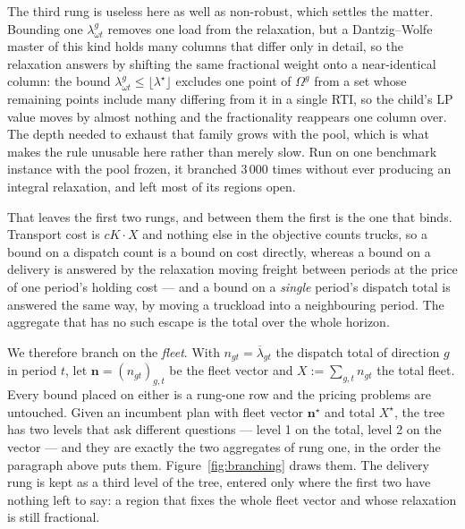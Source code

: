 The third rung is useless here as well as non-robust, which settles the
matter. Bounding
one $\lambda^{g}_{\omega t}$ removes one load from the relaxation, but a
Dantzig--Wolfe master of this kind holds many columns that differ only
in detail, so the relaxation answers by shifting the same fractional
weight onto a near-identical column: the bound
$\lambda^{g}_{\omega t}\le\lfloor\lambda^{\star}\rfloor$ excludes one
point of $\Omega^{g}$ from a set whose remaining points include many
differing from it in a single RTI, so the child's LP value moves by
almost nothing and the fractionality reappears one column over. The
depth needed to exhaust that family grows with the pool, which is what
makes the rule unusable here rather than merely slow. Run on one
benchmark instance with the pool frozen, it branched $3\,000$ times
without ever producing an integral relaxation, and left most of its
regions open.

That leaves the first two rungs, and between them the first is the one
that binds. Transport cost is $cK\cdot X$ and nothing else in the
objective counts trucks, so a bound on a dispatch count is a bound on
cost directly, whereas a bound on a delivery is answered by the
relaxation moving freight between periods at the price of one period's
holding cost --- and a bound on a \emph{single} period's dispatch total
is answered the same way, by moving a truckload into a neighbouring
period. The aggregate that has no such escape is the total over the
whole horizon.

We therefore branch on the \emph{fleet}. With $n_{gt}=\overline{\lambda}_{gt}$
the dispatch total of direction $g$ in period $t$, let
$\mathbf{n}=(n_{gt})_{g,t}$ be the fleet vector and
$X:=\sum_{g,t}n_{gt}$ the total fleet. Every bound placed on either is
a rung-one row and the pricing problems are untouched. Given an
incumbent plan with fleet vector $\mathbf{n}^{\star}$ and total
$X^{\star}$, the tree has two levels that ask different questions ---
level 1 on the total, level 2 on the vector --- and they are exactly
the two aggregates of rung one, in the order the paragraph above puts
them. Figure~\ref{fig:branching} draws them. The delivery rung is kept as a
third level of the tree, entered only where the first two have nothing
left to say: a region that fixes the whole fleet vector and whose
relaxation is still fractional.

